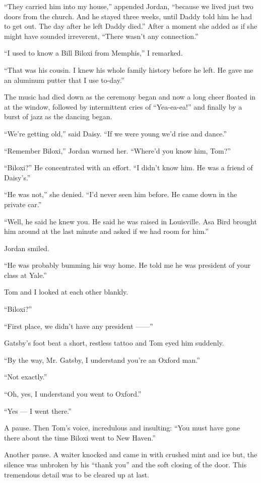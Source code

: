 \documentclass{znotebook}
\begin{document}
``They carried him into my house,'' appended Jordan, ``because we lived just two doors from the church. And he stayed three weeks, until Daddy told him he had to get out. The day after he left Daddy died.'' After a moment she added as if she might have sounded irreverent, ``There wasn't any connection.''

``I used to know a Bill Biloxi from Memphis,'' I remarked.

``That was his cousin. I knew his whole family history before he left. He gave me an aluminum putter that I use to-day.''

The music had died down as the ceremony began and now a long cheer floated in at the window, followed by intermittent cries of ``Yea-ea-ea!'' and finally by a burst of jazz as the dancing began.

``We're getting old,'' said Daisy. ``If we were young we'd rise and dance.''

``Remember Biloxi,'' Jordan warned her. ``Where'd you know him, Tom?''

``Biloxi?'' He concentrated with an effort. ``I didn't know him. He was a friend of Daisy's.''

``He was not,'' she denied. ``I'd never seen him before. He came down in the private car.''

``Well, he said he knew you. He said he was raised in Louisville. Asa Bird brought him around at the last minute and asked if we had room for him.''

Jordan smiled.

``He was probably bumming his way home. He told me he was president of your class at Yale.''

Tom and I looked at each other blankly.

``Biloxi?''

``First place, we didn't have any president ——''

Gatsby's foot beat a short, restless tattoo and Tom eyed him suddenly.

``By the way, Mr. Gatsby, I understand you're an Oxford man.''

``Not exactly.''

``Oh, yes, I understand you went to Oxford.''

``Yes — I went there.''

A pause. Then Tom's voice, incredulous and insulting: ``You must have gone there about the time Biloxi went to New Haven.''

Another pause. A waiter knocked and came in with crushed mint and ice but, the silence was unbroken by his ``thank you'' and the soft closing of the door. This tremendous detail was to be cleared up at last.
\end{document}
